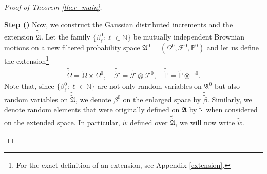 \documentclass[english,a4paper,11pt]{amsart}
\theoremstyle{plain}
\theoremstyle{definition}
\theoremstyle{remark}
\numberwithin{equation}{section}
\newcounter{lil1}
\newenvironment{step}
{\begin{list} { \bf Step (\Roman{lil1})}
		{ \usecounter{lil1}
			\setlength{\leftmargin}{0.0cm}
			\setlength{\topsep}{0.2cm}
			\setlength{\itemsep}{0.0cm}
			\setlength{\parsep}{0.1cm}
			\setlength{\itemindent}{0.8cm}
			\setlength{\parskip}{0.0cm}}}
	{\end{list}}
\newcounter{lil33}
\newcounter{lil1q}
\newcommand{\MA}{\mathfrak{A}}
\newcommand{\wi}[1]{{\widetilde{#1}}}
\def\wi{\widetilde}
\newcommand{\CF}{{{ \mathcal F }}}
\newcommand{\NN}{\mathbb{N}}
\newcommand{\PP}{{\mathbb{P}}}
\newcommand{\DEQSZ}{\begin{eqnarray} }
\newcommand{\EEQSZ}{\end{eqnarray} }
\begin{document}
\begin{proof}[Proof of Theorem \ref{ther_main}]
\begin{step}
	Now, we construct the Gaussian distributed increments and the extension $\wi{\wi{\MA}}$. 
	Let the family $\{ {\beta}^0_\ell:\ell\in\NN\}$ be mutually independent Brownian motions on a new filtered probability space ${\mathfrak{A}}^0=(\Omega^0,\CF^0,\PP^0)$ and let
us 	define the extension\footnote{For the exact definition of an extension, see  Appendix \ref{extension}.}
	\DEQSZ\label{sigmatilde}
	\wi{\wi{{\Omega}}}= \wi{\Omega} \times \Omega^{0},  \quad 
	\wi{\wi{\mathscr{F}}}=\wi{\mathscr{F} }\otimes \mathscr{F}^{0}, \quad  \wi{\wi{\mathbb{P}}}=\wi{\mathbb{P}} \otimes \mathbb{P}^{0}
	.
	\EEQSZ
Note that, since $\{\beta_\ell^{0} : \ell\in\mathbb{N}\}$ are not only random variables on $\mathfrak{A}^{0}$ but also random variables on $\widetilde{\widetilde{\mathfrak{A}}}$, we denote $\beta^{0}$ on the enlarged space by $\widetilde{\widetilde{\beta}}$. Similarly, we denote random elements that were originally defined on $\widetilde{\mathfrak{A}}$ by $\widetilde{\widetilde{\cdot}}$ when considered on the extended space. In particular, $\widetilde{w}$ defined over $\widetilde{\widetilde{\mathfrak{A}}}$, we will now write $\widetilde{\widetilde{w}}$.


\end{step}
\end{proof}
\end{document}
